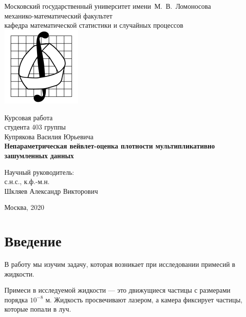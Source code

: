 \documentclass[12pt, a4paper]{report}
\begin{document}
%
\thispagestyle{empty}
\sloppy
\begin{titlepage}
\begin{center}
Московский государственный университет имени~М.~В.~Ломоносова\\
механико-математический факультет\\
кафедра математической статистики и случайных процессов\\

\centering
\includegraphics[width=0.3\textwidth]{mechmath.jpg}

\vspace*{100pt} Курсовая работа\\студента 403 группы \\
Купрякова Василия Юрьевича
\\
\vspace{10pt} {\Large{\textbf{Непараметрическая вейвлет-оценка плотности мультипликативно зашумленных данных}}\\}

\vspace*{40pt}

\begin{flushright}
Научный руководитель:\\ с.н.с., к.ф.-м.н.\\  Шкляев Александр Викторович\\
\end{flushright}

\vspace*{\fill} Москва, 2020
\end{center}
\end{titlepage}
\clearpage
%
\tableofcontents
%
\chapter{Введение}
В работу мы изучим задачу, которая возникает при исследовании примесий в жидкости.

Примеси в исследуемой жидкости --- это движущиеся частицы с размерами порядка $10^{-8}$ м.
Жидкость просвечивают лазером, а камера фиксирует частицы, которые попали в луч.
\end{document}
